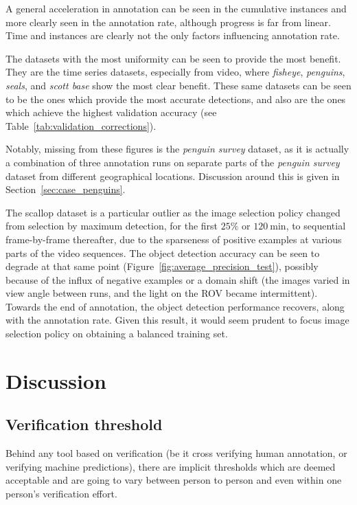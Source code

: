 A general acceleration in annotation can be seen in the  cumulative instances and more clearly seen in the annotation rate, although progress is far from linear. Time and instances are clearly not the only factors influencing annotation rate. 

The datasets with the most uniformity can be seen to provide the most benefit. They are the time series datasets, especially from video, where \emph{fisheye}, \emph{penguins}, \emph{seals}, and \emph{scott base} show the most clear benefit. These same datasets can be seen to be the ones which provide the most accurate detections, and also are the ones which achieve the highest validation accuracy (see Table~\ref{tab:validation_corrections}).

Notably, missing from these figures is the \emph{penguin survey} dataset, as it is actually a combination of three annotation runs on separate parts of the \emph{penguin survey} dataset from different geographical locations. Discussion around this is given in Section~\ref{sec:case_penguins}.

The scallop dataset is a particular outlier as the image selection policy changed from selection by maximum detection, for the first $25\%$ or $\SI{120}{\minute}$, to sequential frame-by-frame thereafter, due to the sparseness of positive examples at various parts of the video sequences. The object detection accuracy can be seen to degrade at that same point (Figure~\ref{fig:average_precision_test}), possibly because of the influx of negative examples or a domain shift (the images varied in view angle between runs, and the light on the \gls{ROV} became intermittent). Towards the end of annotation, the object detection performance recovers, along with the annotation rate. Given this result, it would seem prudent to focus image selection policy on obtaining a balanced training set. 

\section{Discussion}
\label{sec:discussion}

\subsection{Verification threshold}
\label{sec:verification_threshold}

Behind any tool based on verification (be it cross verifying human annotation, or verifying machine predictions), there are implicit thresholds which are deemed acceptable and are going to vary between person to person and even within one person's verification effort. 

